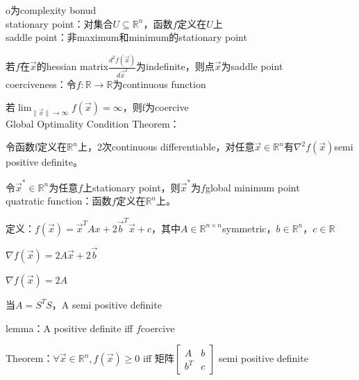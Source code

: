 \documentclass[UTF8]{ctexart}
\begin{document}
  \quad \quad o为complexity bonud\\
stationary point：对集合$U \subseteq \mathbb{R}^n$，函数$f$定义在$U$上\\
saddle point：非maximum和minimum的stationary point

  若$f$在$\vec{x}$的hessian matrix$\frac{d^2f(\vec{x})}{d\vec{x}^2}$为indefinite，则点$\vec{x}$为saddle point\\
coerciveness：令$f : \mathbb{R} \rightarrow \mathbb{R} $为continuous function

  若$\lim_{\|\vec{x}\| \to \infty} f(\vec{x}) = \infty $，则f为coercive\\
Global Optimality Condition Theorem：

  令函数f定义在$\mathbb{R}^n$上，2次continuous differentiable，对任意$\vec{x} \in \mathbb{R}^n$有$\nabla^2 f(\vec{x})$semi positive definite。

  令$\vec{x}^* \in \mathbb{R}^n$为任意$f$上stationary point，则$\vec{x}^*$为$f$global minimum point\\
quatratic function：函数$f$定义在$\mathbb{R}^n$上。

  定义：$f(\vec{x}) = \vec{x}^TAx + 2\vec{b}^T\vec{x} + c$，其中$A \in \mathbb{R}^{n \times n}$symmetric，$b \in \mathbb{R}^n$，$c \in \mathbb{R} $

  \quad $\nabla f(\vec{x}) = 2A\vec{x} + 2\vec{b}$

  \quad $\nabla f(\vec{x}) = 2A$

  \quad 当$A = S^TS$，A semi positive definite

  lemma：A positive definite iff $f$coercive

  Theorem：$\forall \vec{x} \in \mathbb{R}^n, f(\vec{x}) \geq 0$ iff 矩阵$\begin{bmatrix}
    A & b \\
    b^T & c
    \end{bmatrix}$ semi positive definite
  

  
  
\end{document}

